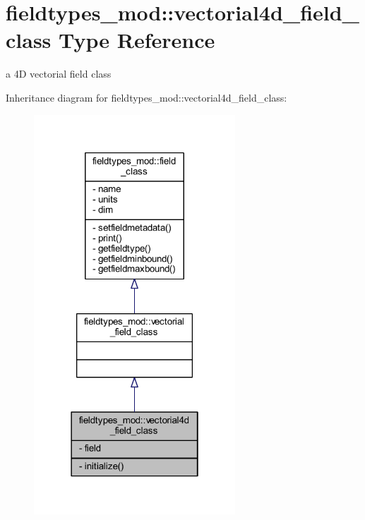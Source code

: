 \hypertarget{structfieldtypes__mod_1_1vectorial4d__field__class}{}\section{fieldtypes\+\_\+mod\+:\+:vectorial4d\+\_\+field\+\_\+class Type Reference}
\label{structfieldtypes__mod_1_1vectorial4d__field__class}


a 4D vectorial field class  




Inheritance diagram for fieldtypes\+\_\+mod\+:\+:vectorial4d\+\_\+field\+\_\+class\+:\nopagebreak
\begin{figure}[H]
\begin{center}
\leavevmode
\includegraphics[width=214pt]{structfieldtypes__mod_1_1vectorial4d__field__class__inherit__graph}
\end{center}
\end{figure}


